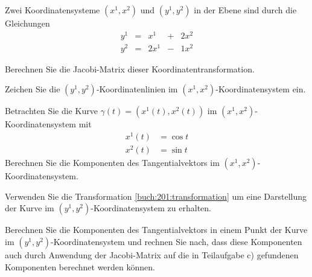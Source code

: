 Zwei Koordinatensysteme $(x^1,x^2)$ und $(y^1,y^2)$ in der Ebene sind
durch die Gleichungen
\begin{equation}
\renewcommand\arraycolsep{2pt}
\begin{array}{rcrcr}
y^1 &=&  x^1 &+& 2x^2 \\
y^2 &=& 2x^1 &-& 1x^2
\end{array}
\label{buch:201:transformation}
\end{equation}
\begin{teilaufgaben}
\item
Berechnen Sie die Jacobi-Matrix dieser Koordinatentransformation.
\item
Zeichen Sie die $(y^1,y^2)$-Koordinatenlinien im
$(x^1,x^2)$-Koordinatensystem ein.
\item
Betrachten Sie die Kurve $\gamma(t) = (x^1(t),x^2(t))$ im
$(x^1,x^2)$-Koordinatensystem mit
\begin{align*}
x^1(t) &= \cos t \\
x^2(t) &= \sin t
\end{align*}
Berechnen Sie die Komponenten des Tangentialvektors im
$(x^1,x^2)$-Koordinaten\-sys\-tem.
\item
Verwenden Sie die Transformation \eqref{buch:201:transformation}
um eine Darstellung der Kurve im $(y^1,y^2)$-Koordinaten\-system
zu erhalten.
\item
Berechnen Sie die Komponenten des Tangentialvektors in einem
Punkt der Kurve im $(y^1,y^2)$-Koordinatensystem und rechnen Sie
nach, dass diese Komponenten auch durch Anwendung der Jacobi-Matrix
auf die in Teilaufgabe c) gefundenen Komponenten berechnet werden
können.
\end{teilaufgaben}

